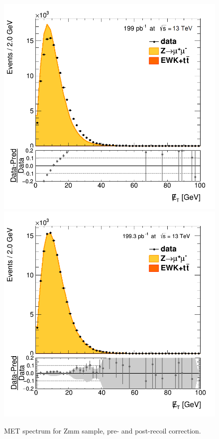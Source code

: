\begin{figure}
\centering
\includegraphics[width=0.49\linewidth]{plots/Recoil/close_nocorr_13/fitmetp.png}
\includegraphics[width=0.49\linewidth]{plots/Recoil/close_corr_13/fitmetp.png}
\caption{MET spectrum for Zmm sample, pre- and post-recoil correction.}
\label{fig:recoil:validation:met}
\end{figure}